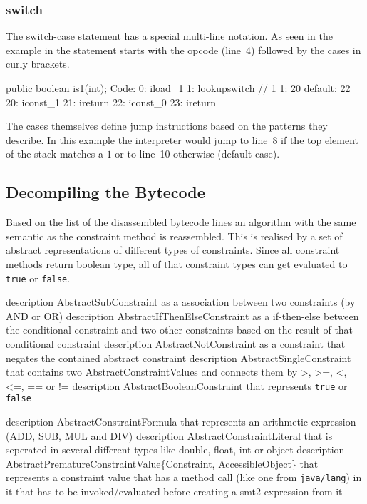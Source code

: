 \documentclass[conference]{IEEEtran}
\begin{document}
\subsubsection{switch}
\label{sec:impl_disa_switch}

The switch-case statement has a special multi-line notation. As seen in the
example in  the statement starts with the
opcode (line~4) followed by the cases in curly brackets.

\begin{bytecodelst}[label=lst:example_bytecode_is1,caption=Bytecode for
  method that checks an integer for being 1]
public boolean is1(int);
  Code:
     0: iload_1
     1: lookupswitch  { // 1
                   1: 20
             default: 22
        }
    20: iconst_1
    21: ireturn
    22: iconst_0
    23: ireturn
\end{bytecodelst}

The cases themselves define jump instructions based on the patterns they
describe. In this example the interpreter would jump to line~8 if the top
element of the stack matches a $1$ or to line~10 otherwise (default case). 

\subsection{Decompiling the Bytecode}
\label{sec:impl_decompiling}

Based on the list of the disassembled bytecode lines an algorithm with the
same semantic as the constraint method is reassembled. This is realised by a
set of abstract representations of different types of constraints. Since all
constraint methods return boolean type, all of that constraint types can get
evaluated to \texttt{true} or \texttt{false}.

\danger description AbstractSubConstraint as a association between two
  constraints (by AND or OR)
\danger description AbstractIfThenElseConstraint as a if-then-else between the
  conditional constraint and two other constraints based on the result of that
  conditional constraint
\danger description AbstractNotConstraint as a constraint that negates the
  contained abstract constraint
\danger description AbstractSingleConstraint that contains two
  AbstractConstraintValues and connects them by >, >=, <, <=, == or !=
\danger description AbstractBooleanConstraint that represents \texttt{true} or
  \texttt{false}

\danger description AbstractConstraintFormula that represents an arithmetic
expression (ADD, SUB, MUL and DIV)
\danger description AbstractConstraintLiteral that is seperated in several
  different types like double, float, int or object
\danger description AbstractPrematureConstraintValue\{Constraint,%
  AccessibleObject\} that represents a constraint value that has a method call
  (like one from \texttt{java/lang}) in it that has to be invoked/evaluated
  before creating a smt2-expression from it
\end{document}
